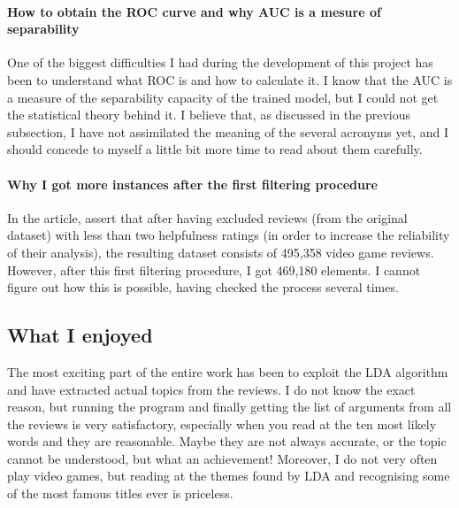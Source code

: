 \documentclass[a4paper]{article}
\begin{document}
				\paragraph{How to obtain the ROC curve and why AUC is a mesure of separability} One of the biggest difficulties I had during the development of this project has been to understand what ROC is and how to calculate it. I know that the AUC is a measure of the separability capacity of the trained model, but I could not get the statistical theory behind it. I believe that, as discussed in the previous subsection, I have not assimilated the meaning of the several acronyms yet, and I should concede to myself a little bit more time to read about them carefully.
				
				\paragraph{Why I got more instances after the first filtering procedure} 
				In the article, \citeauthor{article:muller} assert that after having excluded reviews (from the original dataset) with less than
				two helpfulness ratings (in order to increase the reliability
				of their analysis), the resulting dataset consists of 495,358 video
				game reviews. However, after this first filtering procedure, I got 469,180 elements. I cannot figure out how this is possible, having checked the process several times.
				
			\subsection{What I enjoyed}
				The most exciting part of the entire work has been to exploit the LDA algorithm and have extracted actual topics from the reviews. I do not know the exact reason, but running the program and finally getting the list of arguments from all the reviews is very satisfactory, especially when you read at the ten most likely words and they are reasonable. Maybe they are not always accurate, or the topic cannot be understood, but what an achievement! Moreover, I do not very often play video games, but reading at the themes found by LDA and recognising some of the most famous titles ever is priceless.
	\clearpage
	\nocite{*}
	\printbibliography 
		
\end{document}
